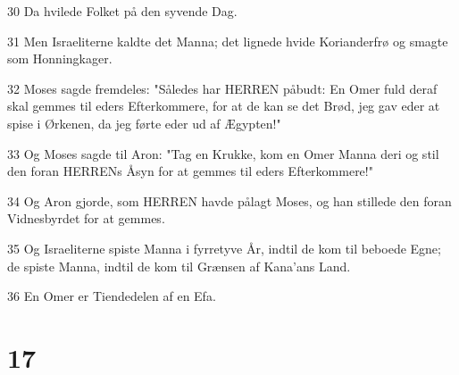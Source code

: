 \par 30 Da hvilede Folket på den syvende Dag.
\par 31 Men Israeliterne kaldte det Manna; det lignede hvide Korianderfrø og smagte som Honningkager.
\par 32 Moses sagde fremdeles: "Således har HERREN påbudt: En Omer fuld deraf skal gemmes til eders Efterkommere, for at de kan se det Brød, jeg gav eder at spise i Ørkenen, da jeg førte eder ud af Ægypten!"
\par 33 Og Moses sagde til Aron: "Tag en Krukke, kom en Omer Manna deri og stil den foran HERRENs Åsyn for at gemmes til eders Efterkommere!"
\par 34 Og Aron gjorde, som HERREN havde pålagt Moses, og han stillede den foran Vidnesbyrdet for at gemmes.
\par 35 Og Israeliterne spiste Manna i fyrretyve År, indtil de kom til beboede Egne; de spiste Manna, indtil de kom til Grænsen af Kana'ans Land.
\par 36 En Omer er Tiendedelen af en Efa.

\chapter{17}

